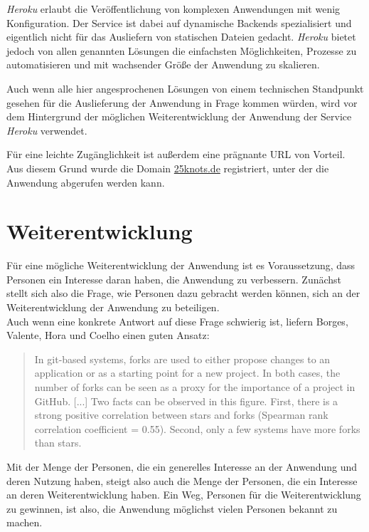 \textit{Heroku} erlaubt die Veröffentlichung von komplexen Anwendungen mit wenig Konfiguration. Der Service ist dabei auf dynamische Backends spezialisiert und eigentlich nicht für das Ausliefern von statischen Dateien gedacht. \textit{Heroku} bietet jedoch von allen genannten Lösungen die einfachsten Möglichkeiten, Prozesse zu automatisieren und mit wachsender Größe der Anwendung zu skalieren.

Auch wenn alle hier angesprochenen Lösungen von einem technischen Standpunkt gesehen für die Auslieferung der Anwendung in Frage kommen würden, wird vor dem Hintergrund der möglichen Weiterentwicklung der Anwendung der Service \textit{Heroku} verwendet.

Für eine leichte Zugänglichkeit ist außerdem eine prägnante URL von Vorteil. Aus diesem Grund wurde die Domain \url{25knots.de} registriert, unter der die Anwendung abgerufen werden kann.

\section{Weiterentwicklung}
\label{chap:public}
Für eine mögliche Weiterentwicklung der Anwendung ist es Voraussetzung, dass Personen ein Interesse daran haben, die Anwendung zu verbessern. Zunächst stellt sich also die Frage, wie Personen dazu gebracht werden können, sich an der Weiterentwicklung der Anwendung zu beteiligen.\\
Auch wenn eine konkrete Antwort auf diese Frage schwierig ist, liefern Borges, Valente, Hora und Coelho einen guten Ansatz:

\begin{quote}
  In git-based systems, forks are used to either propose changes to an application or as
a starting point for a new project. In both cases, the number of forks can be seen as a proxy
for the importance of a project in GitHub. [...] Two facts can be observed in this figure. First, there is a strong positive
correlation between stars and forks (Spearman rank correlation coefficient = 0.55). Second,
only a few systems have more forks than stars. \cite{borges2015popularity}
\end{quote}

Mit der Menge der Personen, die ein generelles Interesse an der Anwendung und deren Nutzung haben, steigt also auch die Menge der Personen, die ein Interesse an deren Weiterentwicklung haben. Ein Weg, Personen für die Weiterentwicklung zu gewinnen, ist also, die Anwendung möglichst vielen Personen bekannt zu machen.

